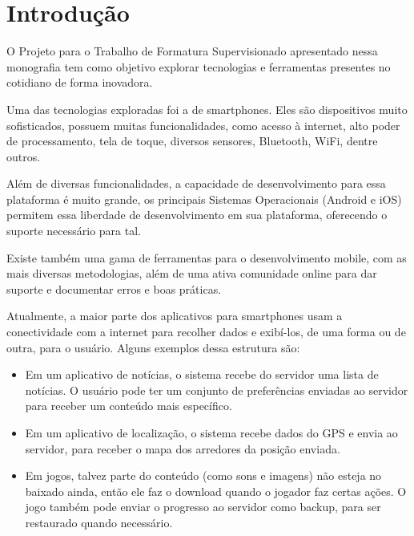 \documentclass[a4paper,12pt]{article}
\begin{document}




\newpage
\section{Introdução}

O Projeto para o Trabalho de Formatura Supervisionado apresentado nessa monografia tem como objetivo explorar tecnologias e ferramentas presentes no cotidiano de forma inovadora.

Uma das tecnologias exploradas foi a de smartphones. Eles são dispositivos muito sofisticados, possuem muitas funcionalidades, como acesso à internet, alto poder de processamento, tela de toque, diversos sensores, Bluetooth, WiFi, dentre outros.

Além de diversas funcionalidades, a capacidade de desenvolvimento para essa plataforma é muito grande, os principais Sistemas Operacionais (Android e iOS) permitem essa liberdade de desenvolvimento em sua plataforma, oferecendo o suporte necessário para tal.

Existe também uma gama de ferramentas para o desenvolvimento mobile, com as mais diversas metodologias, além de uma ativa comunidade online para dar suporte e documentar erros e boas práticas.

Atualmente, a maior parte dos aplicativos para smartphones usam a conectividade com a internet para recolher dados e exibí-los, de uma forma ou de outra, para o usuário. Alguns exemplos dessa estrutura são:

\begin{itemize}
    \item Em um aplicativo de notícias, o sistema recebe do servidor uma lista de notícias. O usuário pode ter um conjunto de preferências enviadas ao servidor para receber um conteúdo mais específico.

    \item Em um aplicativo de localização, o sistema recebe dados do GPS e envia ao servidor, para receber o mapa dos arredores da posição enviada.

    \item Em jogos, talvez parte do conteúdo (como sons e imagens) não esteja no baixado ainda, então ele faz o download quando o jogador faz certas ações. O jogo também pode enviar o progresso ao servidor como backup, para ser restaurado quando necessário.
\end{itemize}
\end{document}
